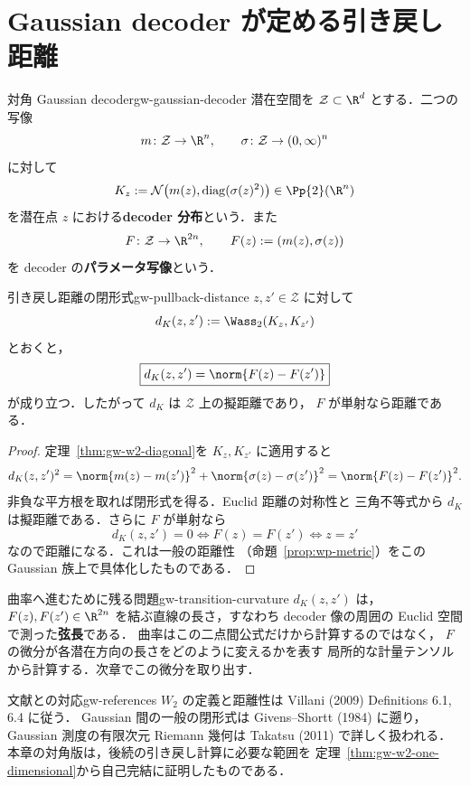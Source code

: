\section{Gaussian decoder が定める引き戻し距離}
\label{sec:gw-decoder-distance}

\begin{definition}{対角 Gaussian decoder}{gw-gaussian-decoder}
  潜在空間を $\mathcal{Z}\subset\R^d$ とする．二つの写像
  \[
    m\colon\mathcal{Z}\to\R^n,
    \qquad
    \sigma\colon\mathcal{Z}\to(0,\infty)^n
  \]
  に対して
  \[
    K_z:=\mathcal{N}\bigl(m(z),\operatorname{diag}(\sigma(z)^2)\bigr)
    \in\Pp{2}(\R^n)
  \]
  を潜在点 $z$ における\textbf{decoder 分布}という．また
  \[
    F\colon\mathcal{Z}\to\R^{2n},
    \qquad
    F(z):=(m(z),\sigma(z))
  \]
  を decoder の\textbf{パラメータ写像}という．
\end{definition}

\begin{proposition}{引き戻し距離の閉形式}{gw-pullback-distance}
  $z,z'\in\mathcal{Z}$ に対して
  \[
    d_K(z,z'):=\Wass_2(K_z,K_{z'})
  \]
  とおくと，
  \[
    \boxed{
      d_K(z,z')=\norm{F(z)-F(z')}
    }
  \]
  が成り立つ．したがって $d_K$ は $\mathcal{Z}$ 上の擬距離であり，
  $F$ が単射なら距離である．
\end{proposition}

\begin{proof}
  定理~\ref{thm:gw-w2-diagonal}を $K_z,K_{z'}$ に適用すると
  \[
    d_K(z,z')^2
    =\norm{m(z)-m(z')}^2+\norm{\sigma(z)-\sigma(z')}^2
    =\norm{F(z)-F(z')}^2.
  \]
  非負な平方根を取れば閉形式を得る．Euclid 距離の対称性と
  三角不等式から $d_K$ は擬距離である．さらに $F$ が単射なら
  \[
    d_K(z,z')=0
    \iff F(z)=F(z')
    \iff z=z'
  \]
  なので距離になる．これは一般の距離性
  （命題~\ref{prop:wp-metric}）をこの Gaussian 族上で具体化したものである．
\end{proof}

\begin{remark}{曲率へ進むために残る問題}{gw-transition-curvature}
  $d_K(z,z')$ は，$F(z),F(z')\in\R^{2n}$ を結ぶ直線の長さ，すなわち
  decoder 像の周囲の Euclid 空間で測った\textbf{弦長}である．
  曲率はこの二点間公式だけから計算するのではなく，
  $F$ の微分が各潜在方向の長さをどのように変えるかを表す
  局所的な計量テンソルから計算する．次章でこの微分を取り出す．
\end{remark}

\begin{remark}{文献との対応}{gw-references}
  $W_2$ の定義と距離性は Villani (2009) Definitions 6.1, 6.4 に従う．
  Gaussian 間の一般の閉形式は Givens--Shortt (1984) に遡り，
  Gaussian 測度の有限次元 Riemann 幾何は Takatsu (2011) で詳しく扱われる．
  本章の対角版は，後続の引き戻し計算に必要な範囲を
  定理~\ref{thm:gw-w2-one-dimensional}から自己完結に証明したものである．
\end{remark}
